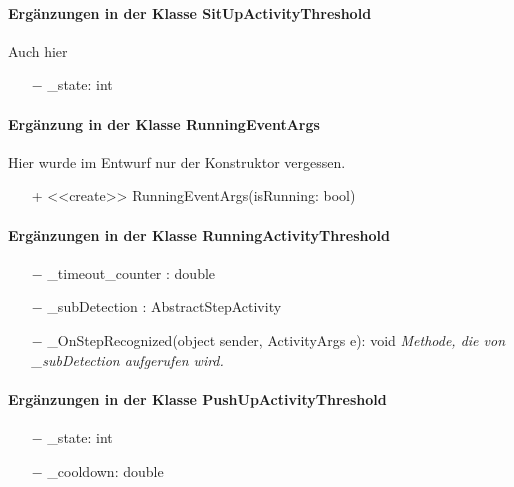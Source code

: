 \documentclass[a4paper,12pt]{article}
\begin{document}
\paragraph{Ergänzungen in der Klasse SitUpActivityThreshold}
Auch hier 
\begin{itemize}
	\item [$-$] \_state: int
\end{itemize}
\paragraph{Ergänzung in der Klasse RunningEventArgs}
Hier wurde im Entwurf nur der Konstruktor vergessen.
\begin{itemize}
	\item [+] <<create>> RunningEventArgs(isRunning: bool)
\end{itemize}
\paragraph{Ergänzungen in der Klasse RunningActivityThreshold}
\begin{itemize}
	\item [$-$] \_timeout\_counter : double
	\item [$-$] \_subDetection : AbstractStepActivity
	\item [$-$] \_OnStepRecognized(object sender, ActivityArgs e): void \textit{Methode, die von \_subDetection aufgerufen wird.}
\end{itemize}
\paragraph{Ergänzungen in der Klasse PushUpActivityThreshold}
\begin{itemize}
	\item [$-$] \_state: int
	\item [$-$] \_cooldown: double
	
\end{itemize}
\end{document}
